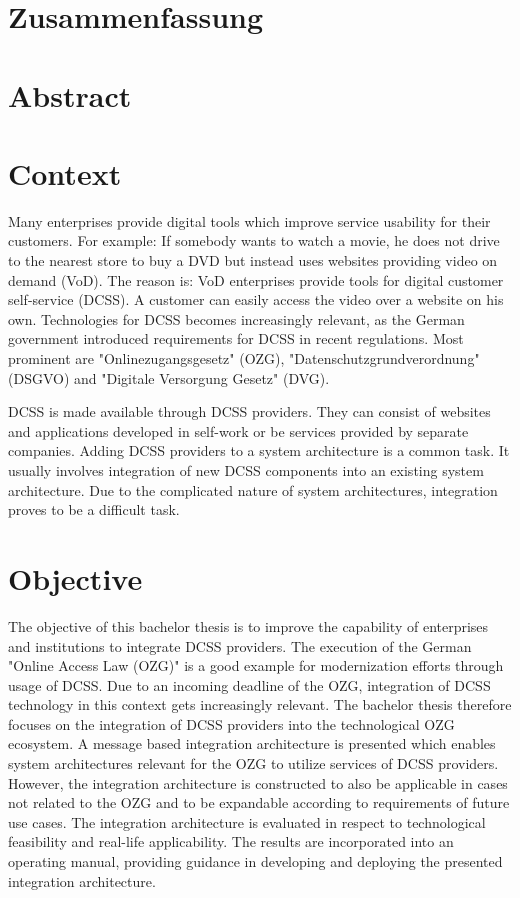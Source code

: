 \documentclass[
     12pt,         %
     a4paper,      %
     BCOR=10mm,version=first,     %
     DIV=14,version=first,        %
     ]{scrreprt}
\begin{document}
\chapter*{Zusammenfassung}

\newpage

\chapter*{Abstract}

\newpage

\tableofcontents
\cleardoublepage
{}

\chapter{Context}

Many enterprises provide digital tools which improve service usability for their customers. For example: If somebody wants to watch a movie, he does not drive to the nearest store to buy a DVD but instead uses websites providing video on demand (VoD). The reason is: VoD enterprises provide tools for digital customer self-service (DCSS). A customer can easily access the video over a website on his own. Technologies for DCSS becomes increasingly relevant, as the German government introduced requirements for DCSS in recent regulations. Most prominent are  "Onlinezugangsgesetz" (OZG), "Datenschutzgrundverordnung" (DSGVO) and "Digitale Versorgung Gesetz" (DVG). 

DCSS is made available through DCSS providers. They can consist of websites and applications developed in self-work or be services provided by separate companies. Adding DCSS providers to a system architecture is a common task. It usually involves integration of new DCSS components into an existing system architecture. Due to the complicated nature of system architectures, integration proves to be a difficult task.

\chapter{Objective}

The objective of this bachelor thesis is to improve the capability of enterprises and institutions to integrate DCSS providers.
The execution of the German "Online Access Law (OZG)" is a good example for modernization efforts through usage of DCSS. Due to an incoming deadline of the OZG, integration of DCSS technology in this context gets increasingly relevant.
The bachelor thesis therefore focuses on the integration of DCSS providers into the technological OZG ecosystem. A message based integration architecture is presented which enables system architectures relevant for the OZG to utilize services of DCSS providers. However, the integration architecture is constructed to also be applicable in cases not related to the OZG and to be expandable according to requirements of future use cases.
The integration architecture is evaluated in respect to technological feasibility and real-life applicability. The results are incorporated into an operating manual, providing guidance in developing and deploying the presented integration architecture.
\end{document}
